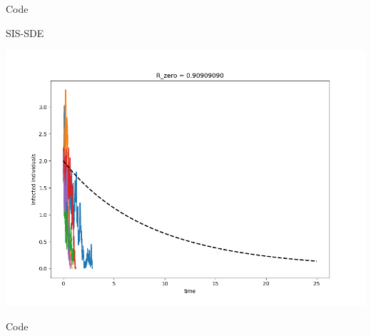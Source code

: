 \begin{frame}{Code}
    \begin{figure}
    \centering
      \tiny
    \lstset{language=python}
         
   \end{figure}
\end{frame}

\begin{frame}{SIS-SDE}
    \begin{center}
    \includegraphics[width=\textwidth]{./homework/HW03.png}
    \end{center}
\end{frame}
\begin{frame}{Code}
    \begin{figure}
    \centering
      \tiny
    \lstset{language=python}
         
   \end{figure}
\end{frame}
